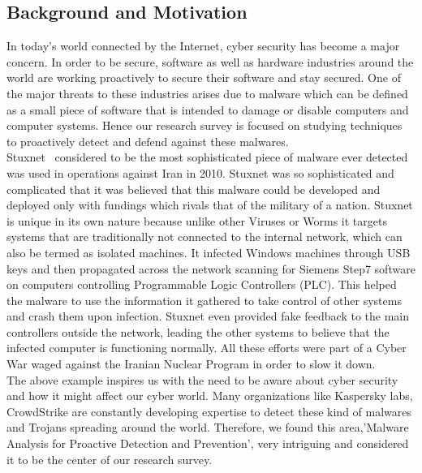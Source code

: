 \documentclass[11pt]{article}
\begin{document}
	\subsection{Background and Motivation}
	In today’s world connected by the Internet, cyber security has become a major concern. In order
to be secure, software as well as hardware industries around the world are working proactively to
secure their software and stay secured. One of the major threats to these industries arises due to
malware which can be defined as a small piece of software that is intended to damage or disable
computers and computer systems. Hence our research survey is focused on studying techniques
to proactively detect and defend against these malwares.\\ Stuxnet~\cite{creators2013kill, stuxnet} considered to be the most sophisticated piece of malware ever detected was used in operations against Iran in 2010. Stuxnet was so sophisticated and complicated that it was believed that this malware could be developed and deployed only with fundings which rivals that of the military of a nation. Stuxnet is unique in its own nature because unlike other Viruses or Worms it targets systems that are traditionally not connected to the internal network, which can also be termed as isolated machines. It infected Windows machines through USB keys and then propagated across the network scanning for Siemens Step7 software on computers controlling Programmable Logic Controllers (PLC). This helped the malware to use the information it gathered to take control of other systems and crash them upon infection. Stuxnet even provided fake feedback to the main controllers outside the network, leading the other systems to believe that the infected computer is functioning normally. All these efforts were part of a Cyber War waged against the Iranian Nuclear Program in order to slow it down. \\
The above example inspires us with the need to be aware about cyber security and how it might affect our cyber world. Many organizations like Kaspersky labs, CrowdStrike are constantly developing expertise to detect these kind of malwares and Trojans spreading around the world. Therefore, we found this area,'Malware Analysis for Proactive Detection and Prevention', very intriguing and considered it to be the center of our research survey.
\end{document}

